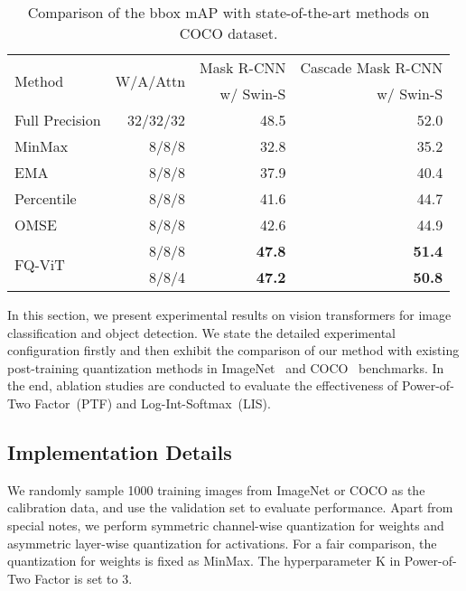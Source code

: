 \documentclass{article}
\begin{document}
\begin{table*}[t]
\centering
\small
\begin{tabular}{lrrr}
\toprule
\multirow{2}{*}{Method}  & \multirow{2}{*}{W/A/Attn}    & Mask R-CNN & Cascade Mask R-CNN \\
& & w/ Swin-S& w/ Swin-S\\
\midrule
\rowcolor{c_gray} Full Precision    & 32/32/32      & 48.5                & 52.0                   \\
\midrule
MinMax            & 8/8/8         & 32.8                & 35.2                   \\
EMA~\cite{jacob2018quantization}               & 8/8/8         & 37.9                & 40.4                   \\
Percentile~\cite{li2019fully}        & 8/8/8         & 41.6                & 44.7                   \\
OMSE~\cite{choukroun2019low}              & 8/8/8         & 42.6                & 44.9                   \\
\midrule
\multirow{2}{*}{FQ-ViT}      & 8/8/8         & \textbf{47.8}       & \textbf{51.4}          \\
 & 8/8/4         & \textbf{47.2}       & \textbf{50.8}  \\
\bottomrule
\end{tabular}
\caption{Comparison of the bbox mAP with state-of-the-art methods on COCO dataset.}
\label{tab:coco}
\end{table*}


In this section, we present experimental results on vision transformers for image classification and object detection. We state the detailed experimental configuration firstly and then exhibit the comparison of our method with existing post-training quantization methods in ImageNet~\cite{krizhevsky2012imagenet} and COCO~\cite{lin2014microsoft} benchmarks. In the end, ablation studies are conducted to evaluate the effectiveness of Power-of-Two Factor~(PTF) and Log-Int-Softmax~(LIS).

\subsection{Implementation Details}


We randomly sample 1000 training images from ImageNet or COCO as the calibration data, and use the validation set to evaluate performance.
Apart from special notes, we perform symmetric channel-wise quantization for weights and asymmetric layer-wise quantization for activations. For a fair comparison, the quantization for weights is fixed as MinMax.
The hyperparameter $\textrm{K}$ in Power-of-Two Factor is set to 3.
\end{document}
